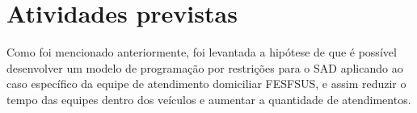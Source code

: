 




\section{Atividades previstas}
Como foi mencionado anteriormente, foi levantada a hipótese de que é possível desenvolver um modelo de programação por restrições para o \ac{SAD} aplicando ao caso específico da equipe de atendimento domiciliar FESFSUS, e assim reduzir o tempo das equipes dentro dos veículos e aumentar a quantidade de atendimentos.

